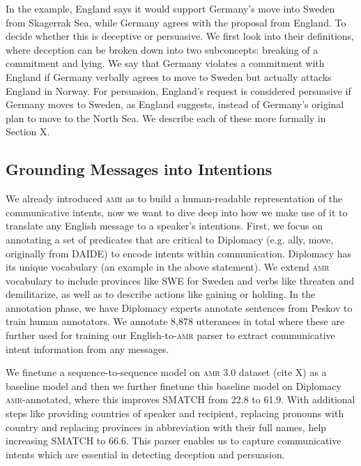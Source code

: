 \documentclass[oneside]{memoir}
\newcommand{\abr}[1]{\textsc{#1}}
\begin{document}
In the example, England says it would support Germany's move into Sweden from Skagerrak Sea, while Germany agrees with the proposal from England. To decide whether this is deceptive or persuasive. We first look into their definitions, where deception can be broken down into two subconcepts: breaking of a commitment and lying. We say that Germany violates a commitment with England if Germany verbally agrees to move to Sweden but actually attacks England in Norway. For persuasion, England’s request is
considered persuasive if Germany moves to Sweden, as England suggests, instead of Germany’s
original plan to move to the North Sea. We describe each of these
more formally in Section X.

\subsection{Grounding Messages into Intentions}
We already introduced \abr{amr} as to build a human-readable representation of the communicative intents, now we want to dive deep into how we make use of it to translate any English message to a speaker's intentions. First, we focus on annotating a set of predicates that are critical to Diplomacy (e.g. ally, move, originally from \abr{DAIDE}) to encode intents within communication. Diplomacy has its unique vocabulary (an example in the above statement). We extend \abr{amr} vocabulary to include provinces like SWE for Sweden and verbs like threaten and demilitarize, as well as to describe actions like gaining or holding. In the annotation phase, we have Diplomacy experts annotate sentences from Peskov to train human annotators. We annotate 8,878 utterances in  total where these are further used for training our English-to-\abr{amr} parser to extract communicative intent information from any messages.

We finetune a sequence-to-sequence model on \abr{amr} 3.0 dataset (cite X) as a baseline model and then we further finetune this baseline model on Diplomacy \abr{amr}-annotated, where this improves \abr{SMATCH} from 22.8 to 61.9. With additional steps like providing countries of speaker and recipient, replacing pronouns with country and  replacing provinces in abbreviation with their full names, help increasing \abr{SMATCH} to 66.6. This parser enables us to capture communicative intents which are essential in detecting deception and persuasion. 
\end{document}
